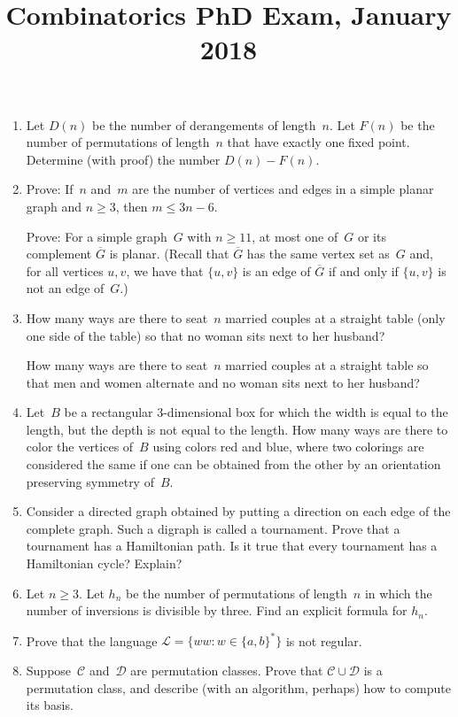 \documentclass[11pt,letterpaper]{article}
\title{Combinatorics PhD Exam, January 2018}
\author{}
\date{}
\newenvironment{examproblems}[2]{%
  \def\ProblemHeadingTag{#2}%
  \AssignTaggingSocketPlug{block/list/label}{examproblem}%
  \begin{enumerate}%
  \setcounter{enumi}{#1}%
  \renewcommand{\labelenumi}{\textbf{\theenumi.}}%
  \setlength{\topsep}{0.35em}%
  \setlength{\partopsep}{0pt}%
  \setlength{\itemsep}{0.48em}%
  \setlength{\parsep}{0.18em}%
}{\end{enumerate}}
\begin{document}
\maketitle
\thispagestyle{empty}
\begin{examproblems}{0}{H2}
\def\ProblemHeadingText{Problem 1.}
\item
Let \(D(n)\) be the number of derangements of length~\(n\). Let \(F(n)\) be the number of permutations of length~\(n\) that have exactly one fixed point. Determine (with proof) the number \(D(n)-F(n)\).
\def\ProblemHeadingText{Problem 2.}
\item
Prove: If~\(n\) and~\(m\) are the number of vertices and edges in a simple planar graph and \(n \ge 3\), then \(m \le 3n-6\).

\par
Prove: For a simple graph~\(G\) with \(n \ge 11\), at most one of~\(G\) or its complement \(\overline{G}\) is planar. (Recall that \(\overline{G}\) has the same vertex set as~\(G\) and, for all vertices \(u,v\), we have that \(\{u,v\}\) is an edge of \(\overline{G}\) if and only if \(\{u,v\}\) is not an edge of~\(G\).)
\def\ProblemHeadingText{Problem 3.}
\item
How many ways are there to seat~\(n\) married couples at a straight table (only one side of the table) so that no woman sits next to her husband?

\par
How many ways are there to seat~\(n\) married couples at a straight table so that men and women alternate and no woman sits next to her husband?
\def\ProblemHeadingText{Problem 4.}
\item
Let~\(B\) be a rectangular 3-dimensional box for which the width is equal to the length, but the depth is not equal to the length. How many ways are there to color the vertices of~\(B\) using colors red and blue, where two colorings are considered the same if one can be obtained from the other by an orientation preserving symmetry of~\(B\).
\def\ProblemHeadingText{Problem 5.}
\item
Consider a directed graph obtained by putting a direction on each edge of the complete graph. Such a digraph is called a tournament. Prove that a tournament has a Hamiltonian path. Is it true that every tournament has a Hamiltonian cycle? Explain?
\def\ProblemHeadingText{Problem 6.}
\item
Let \(n \ge 3\). Let \(h_n\) be the number of permutations of length~\(n\) in which the number of inversions is divisible by three. Find an explicit formula for \(h_n\).
\def\ProblemHeadingText{Problem 7.}
\item
Prove that the language \(\mathcal{L}=\{ww : w \in \{a,b\}^*\}\) is not regular.
\def\ProblemHeadingText{Problem 8.}
\item
Suppose~\(\mathcal{C}\) and~\(\mathcal{D}\) are permutation classes. Prove that \(\mathcal{C}\cup\mathcal{D}\) is a permutation class, and describe (with an algorithm, perhaps) how to compute its basis.
\end{examproblems}
\end{document}
